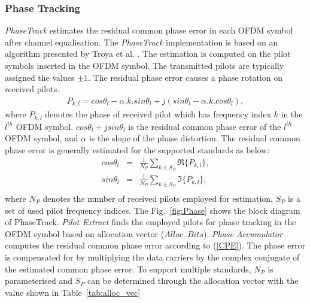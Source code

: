 \subsubsection{Phase Tracking}
\emph{PhaseTrack} estimates the residual common phase error in each OFDM symbol after channel equalisation.
The \emph{PhaseTrack} implementation is based on an algorithm presented by Troya et al. \cite{Troya2007}.
The estimation is computed on the pilot symbols inserted in the OFDM symbol. The transmitted pilots are typically assigned
the values $\pm 1$. The residual phase error causes a phase rotation on received pilots.
\begin{eqnarray}
\label{PhaseTrack}
P_{k,l} = cos\theta_{l} -\alpha.k.sin \theta_{l} + j (sin\theta_{l} -\alpha.k.cos\theta_{l}),
\end{eqnarray}
where $P_{k,l}$ denotes the phase of received pilot which has frequency index $k$ in the $l^{th}$ OFDM symbol.
$cos\theta_{l} + j sin\theta_{l}$ is the residual common phase error of the $l^{th}$ OFDM symbol, and $\alpha$ is the slope of the phase distortion.
The residual common phase error is generally estimated for the supported standards as below:
\begin{eqnarray}
\label{CPE}
cos\theta_{l} &=& \frac{1}{N_P} \sum_{k \in S_P} \Re\{P_{k,l}\}, \\ \nonumber
sin\theta_{l} &=& \frac{1}{N_P} \sum_{k \in S_P} \Im\{P_{k,l}\}, \\ \nonumber
\end{eqnarray}
where $N_P$ denotes the number of received pilots employed for estimation, $S_P$ is a set of used pilot frequency indices.
The Fig.~\ref{fig:Phase} shows the block diagram of PhaseTrack. \emph{Pilot Extract} finds the employed pilots for phase tracking in the OFDM symbol based on allocation vector ($Alloc.~Bits$).
\emph{Phase Accumulator} computes the residual common phase error according to (\ref{CPE}).
The phase error is compensated for by multiplying the data carriers by the complex conjugate of the estimated common phase error.
To support multiple standards, $N_P$ is parameterised and $S_P$ can be determined through the allocation vector with the value shown in Table~\ref{tab:alloc_vec}

